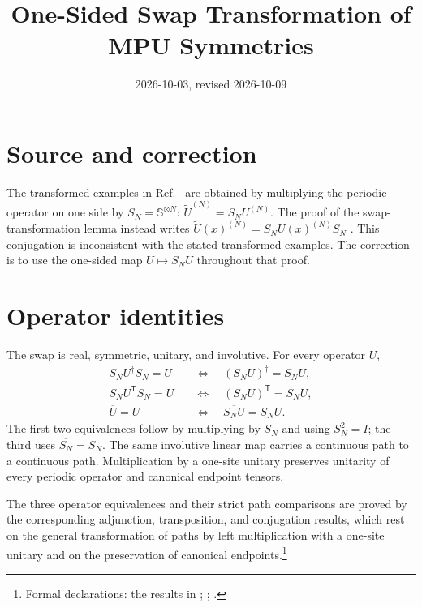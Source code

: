 \documentclass{article}
\title{One-Sided Swap Transformation of MPU Symmetries}
\author{}
\date{2026-10-03, revised 2026-10-09}
\begin{document}
\maketitle
{}

\section{Source and correction}

The transformed examples in Ref.~\cite[lines~2053--2063]{Cirac2017MPU}
are obtained by multiplying the periodic operator on one side by
$S_N=\mathbb S^{\otimes N}$: $\widetilde U^{(N)}=S_NU^{(N)}$.
The proof of the swap-transformation lemma instead writes
$\widetilde U(x)^{(N)}=S_NU(x)^{(N)}S_N$
\cite[lines~2076--2084]{Cirac2017MPU}. This conjugation is inconsistent with
the stated transformed examples. The correction is to use the one-sided
map $U\mapsto S_NU$ throughout that proof.

\section{Operator identities}

The swap is real, symmetric, unitary, and involutive. For every operator $U$,
\begin{align}
    S_NU^\dagger S_N=U
     &\quad\Longleftrightarrow\quad (S_NU)^\dagger=S_NU,
    \label{eq:mpu_swap_one_sided_adjoint} \\
    S_NU^{\mathsf T}S_N=U
     &\quad\Longleftrightarrow\quad (S_NU)^{\mathsf T}=S_NU,
    \label{eq:mpu_swap_one_sided_transpose} \\
    \overline U=U
     &\quad\Longleftrightarrow\quad \overline{S_NU}=S_NU.
    \label{eq:mpu_swap_one_sided_conjugation}
\end{align}
The first two equivalences follow by multiplying by $S_N$ and using
$S_N^2=I$; the third uses $\overline{S_N}=S_N$.
The same involutive linear map carries a continuous path to a continuous
path. Multiplication by a one-site unitary preserves unitarity of every
periodic operator and canonical endpoint tensors.

The three operator equivalences and their strict path comparisons
are proved by the corresponding adjunction, transposition, and conjugation
results, which rest on the general transformation of paths by left
multiplication with a one-site unitary and on the preservation of canonical
endpoints.\footnote{Formal declarations: the results in
;
;
.}
\end{document}
